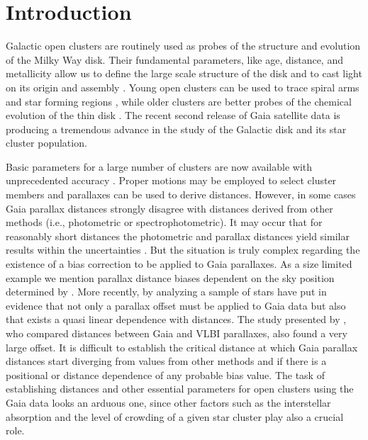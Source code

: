 \documentclass[draft]{aa}
\begin{document}
\maketitle




\section{Introduction}

Galactic open clusters are routinely used as probes of the structure and
evolution of the Milky Way disk. Their fundamental parameters, like age,
distance, and metallicity allow us to define the large scale structure of the
disk and to cast light on its origin and assembly \citep{Janes_1982,
Moitinho_2010,2018A&A...618A..93C}. Young open clusters can be used to trace
spiral arms and star forming regions \citep{Moitinho_2006,Vazquez2008}, while
older clusters are better probes of the chemical evolution of the thin disk
\citep{2009yCat..35120063M}. The recent second release of Gaia satellite data
\citep{GaiaDR2_2018} is producing a tremendous advance in the study of the
Galactic disk and its star cluster population.

Basic parameters for a large number of clusters are now available with
unprecedented accuracy \citep{2018A&A...618A..93C,Soubiran_2018,Bossini_2019}.
Proper motions may be employed to select cluster members and parallaxes can be
used to derive distances. However, in some cases Gaia parallax distances
strongly disagree with distances derived from other methods 
(i.e., photometric or spectrophotometric). It may occur that for reasonably
short distances the photometric and parallax distances yield similar results
within the uncertainties \citep{2018A&A...618A..93C}. But the situation is
truly complex regarding the existence of a bias correction to be applied to
Gaia parallaxes. As a size limited example we mention parallax distance biases
dependent on the sky position determined by \cite{Lindegren_2018}. More
recently, by analyzing a sample of stars \cite{Schonrich2019} have put in
evidence that not only a parallax offset must be applied to Gaia data but also
that exists a quasi linear dependence with distances. The study presented by 
\cite{Xu_2019}, who compared distances between Gaia and VLBI parallaxes, also
found a very large offset.
It is difficult to establish the critical distance at which Gaia parallax
distances start diverging from values from other methods and if there is a
positional or distance dependence of any probable bias value. The  task of
establishing distances and other essential parameters for open clusters using
the Gaia data looks an arduous one, since other factors such as the
interstellar absorption and the level of crowding of a given star cluster play
also a crucial role.
\end{document}

